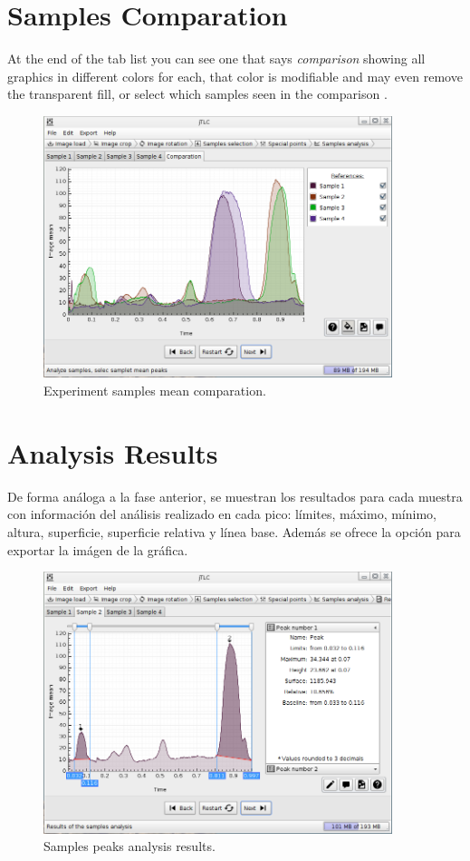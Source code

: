 \section{Samples Comparation}
At the end of the tab list you can see one that says \emph{comparison} showing all graphics in different colors for each, that color is modifiable and may even remove the transparent fill, or select which samples seen in the comparison .
\begin{figure}[H]
	\vspace{0cm}
	\centering
	\includegraphics[width=385px]{imagenes/comparation}
	\centering
	\vspace{-0.4cm}
	\caption{Experiment samples mean comparation.}
	\label{fig:image_samples_comparation}
	\vspace{-0.25cm}
\end{figure}
\newpage

\section{Analysis Results}
De forma an\'aloga a la fase anterior, se muestran los resultados para cada muestra con informaci\'on del an\'alisis realizado en cada pico: l\'imites, m\'aximo, m\'inimo, altura, superficie, superficie relativa y l\'inea  base. Adem\'as se ofrece la opci\'on para exportar la im\'agen de la gr\'afica.
\begin{figure}[H]
	\vspace{0cm}
	\centering
	\includegraphics[width=385px]{imagenes/peaks}
	\centering
	\vspace{-0.4cm}
	\caption{Samples peaks analysis results.}
	\label{fig:image_analysis_results}
	\vspace{-0.25cm}
\end{figure}
\newpage

